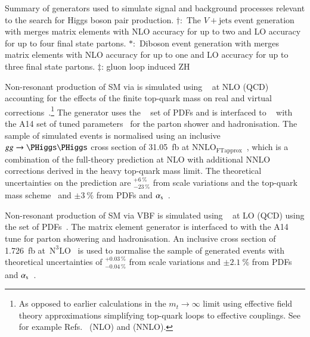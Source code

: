 \begin{sidewaystable}[p]
  \centering

  \caption{Summary of generators used to simulate signal and
    background processes relevant to the search for Higgs boson pair
    production. $\dagger$:~The $V+\text{jets}$ event generation with
    \SHERPA[2.2.1] merges matrix elements with NLO accuracy for up to
    two and LO accuracy for up to four final state partons.
    $*$:~Diboson event generation with \SHERPA[2.2.1] merges matrix
    elements with NLO accuracy for up to one and LO accuracy for up to
    three final state partons. $\ddag$: gluon loop induced ZH }%
  \label{tab:monte_carlo}

  \resizebox{\textwidth}{!}{}
\end{sidewaystable}

Non-resonant production of SM \HH via \ggF is simulated using
\POWHEGBOX[v2]~\cite{Nason:2004rx,Frixione:2007vw,Alioli:2010xd} at
NLO (QCD) accounting for the effects of the finite top-quark mass on
real and virtual
corrections~\cite{Borowka:2016ehy,Baglio:2018lrj,Heinrich:2017kxx}.\footnote{As
  opposed to earlier calculations in the $m_{t} \to \infty$ limit
  using effective field theory approximations simplifying top-quark
  loops to effective couplings. See for example
  Refs.~\cite{Dawson:1998py} (NLO) and \cite{deFlorian:2013jea}
  (NNLO).} The generator uses the
\PDFforLHC[15nlo]~\cite{Butterworth:2015oua} set of PDFs and is
interfaced to \PYTHIA[8]~\cite{Sjostrand:2014zea} with the A14 set of
tuned parameters~\cite{ATL-PHYS-PUB-2014-021} for the parton shower
and hadronisation. The sample of simulated events is normalised using
an inclusive $gg \to \HH$ cross section of \SI{31.05}{\femto\barn} at
$\text{NNLO}_{\text{FTapprox}}$~\cite{Grazzini:2018bsd}, which is a
combination of the full-theory prediction at NLO with additional NNLO
corrections derived in the heavy top-quark mass limit. The theoretical
uncertainties on the prediction are $^{+6\,\%}_{-23\,\%}$ from scale
variations and the top-quark mass scheme~\cite{Baglio:2020wgt} and
$\pm\SI{3}{\percent}$ from PDFs and $\alpha_{\text{s}}$~\cite{LHCHWGHH}.

Non-resonant production of SM \HH via VBF is simulated using
\MGNLO~\cite{Alwall:2014hca} %
at LO (QCD) %
using the \NNPDF[3.0nlo] set of PDFs~\cite{Ball:2014uwa}. The matrix
element generator is interfaced to \PYTHIA[8] with the A14 tune for
parton showering and hadronisation. An inclusive cross section of
\SI{1.726}{\femto\barn}
at~$\text{N}^3\text{LO}$~\cite{Dreyer:2018qbw,LHCHWGHH} is used to
normalise the sample of generated events with theoretical
uncertainties of $^{+0.03\,\%}_{-0.04\,\%}$ from scale variations and
$\pm\SI{2.1}{\percent}$ from PDFs and $\alpha_{\text{s}}$~\cite{LHCHWGHH}.

